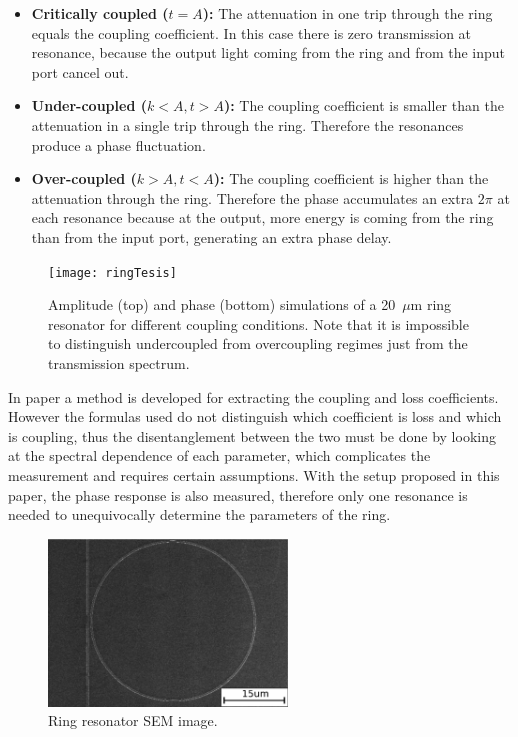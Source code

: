 \documentclass[journal]{IEEEtran}
\begin{document}
\begin{itemize}
 \item \textbf{Critically coupled ($t=A$):} The attenuation in one trip through the ring equals the coupling coefficient. In this case there is zero transmission at resonance, because the output light coming from the ring and from the input port cancel out.
 
 \item \textbf{Under-coupled ($k<A,t>A$):}  The coupling coefficient is smaller than the attenuation in a single trip through the ring. Therefore the resonances produce a phase fluctuation.
 
 \item \textbf{Over-coupled ($k>A,t<A$):} The coupling coefficient is higher than the attenuation through the ring. Therefore the phase accumulates an extra $2\pi$ at each resonance because at the output, more energy is coming from the ring than from the input port, generating an extra phase delay.

\end{itemize}



\begin{figure}[htb]
    \centering
    \texttt{[image: ringTesis]}
    \caption{Amplitude (top) and phase (bottom) simulations of a 20~$\mu$m ring resonator for different coupling conditions. Note that it is impossible to distinguish undercoupled from overcoupling regimes just from the transmission spectrum.}
    \label{fig:ringDifferentCoupling}
\end{figure}

In paper \cite{McKinnon2009} a method is developed for extracting the coupling and loss coefficients. However the formulas used do not distinguish which coefficient is loss and which is coupling, thus the disentanglement between the two must be done by looking at the spectral dependence of each parameter, which complicates the measurement and requires certain assumptions. With the setup proposed in this paper, the phase response is also measured, therefore only one resonance is needed to unequivocally determine the parameters of the ring. 



\begin{figure}[htb]
    \centering
    \includegraphics[width=2.5in]{ringTEscale2}
    \caption{Ring resonator SEM image.}
    \label{fig:semRingPaperRings}
\end{figure}
\end{document}
